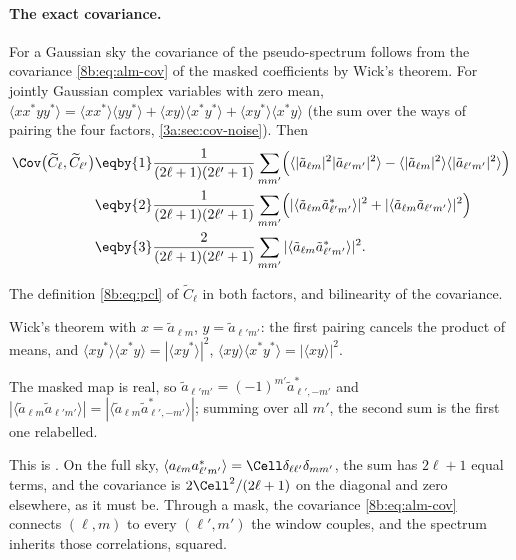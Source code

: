 \paragraph{The exact covariance.}
For a Gaussian sky the covariance of the pseudo-spectrum follows from the covariance
\eqref{8b:eq:alm-cov} of the masked coefficients by Wick's theorem. For jointly Gaussian complex
variables with zero mean, $\langle xx^*yy^*\rangle=\langle xx^*\rangle\langle yy^*\rangle+\langle xy\rangle\langle x^*y^*\rangle+\langle xy^*\rangle\langle x^*y\rangle$
(the sum over the ways of pairing the four factors, \cref{3a:sec:cov-noise}). Then
\begin{align}
  \Cov\bigl(\widetilde C_\ell,\widetilde C_{\ell'}\bigr)
  &\eqby{1}\frac1{(2\ell+1)(2\ell'+1)}\sum_{mm'}\Bigl(\langle|\tilde a_{\ell m}|^2|\tilde a_{\ell'm'}|^2\rangle
     -\langle|\tilde a_{\ell m}|^2\rangle\langle|\tilde a_{\ell'm'}|^2\rangle\Bigr) \nonumber\\
  &\eqby{2}\frac1{(2\ell+1)(2\ell'+1)}\sum_{mm'}\Bigl(|\langle\tilde a_{\ell m}\tilde a^*_{\ell'm'}\rangle|^2
     +|\langle\tilde a_{\ell m}\tilde a_{\ell'm'}\rangle|^2\Bigr) \nonumber\\
  &\eqby{3}\frac2{(2\ell+1)(2\ell'+1)}\sum_{mm'}|\langle\tilde a_{\ell m}\tilde a^*_{\ell'm'}\rangle|^2 .
  \label{8b:eq:cov-exact}
\end{align}
\begin{explain}
  \item The definition \eqref{8b:eq:pcl} of $\widetilde C_\ell$ in both factors, and bilinearity of the covariance.
  \item Wick's theorem with $x=\tilde a_{\ell m}$, $y=\tilde a_{\ell'm'}$: the first pairing cancels the product of means,
        and $\langle xy^*\rangle\langle x^*y\rangle=|\langle xy^*\rangle|^2$, $\langle xy\rangle\langle x^*y^*\rangle=|\langle xy\rangle|^2$.
  \item The masked map is real, so $\tilde a_{\ell'm'}=(-1)^{m'}\tilde a^*_{\ell',-m'}$ and
        $|\langle\tilde a_{\ell m}\tilde a_{\ell'm'}\rangle|=|\langle\tilde a_{\ell m}\tilde a^*_{\ell',-m'}\rangle|$; summing over all $m'$, the
        second sum is the first one relabelled.
\end{explain}
This is \cite[eqs~14 and 18]{Efstathiou2004}. On the full sky,
$\langle a_{\ell m}a^*_{\ell'm'}\rangle=\Cell\delta_{\ell\ell'}\delta_{mm'}$, the sum has $2\ell+1$ equal terms, and the covariance is
$2\Cell^2/(2\ell+1)$ on the diagonal and zero elsewhere, as it must be. Through a mask, the covariance
\eqref{8b:eq:alm-cov} connects $(\ell,m)$ to every $(\ell',m')$ the window couples, and the spectrum
inherits those correlations, squared.

